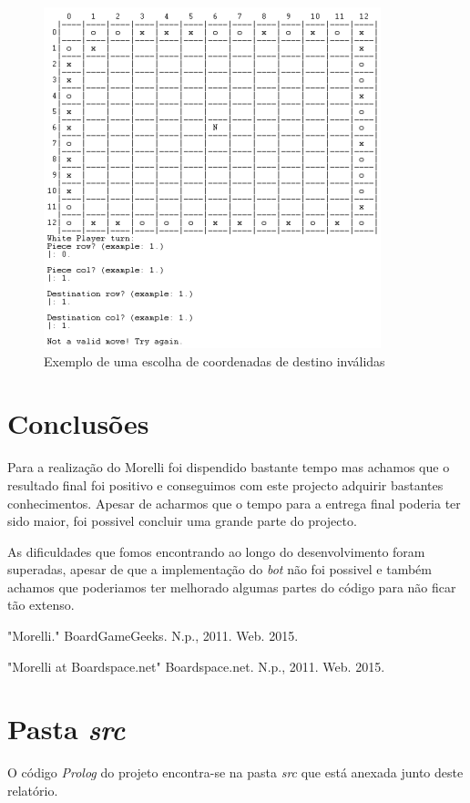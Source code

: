 \documentclass[a4paper]{article}
\begin{document}
\begin{figure}[h!]
\begin{center}
\hspace*{-0.5cm}\includegraphics[scale=1]{game3.png}
\caption{Exemplo de uma escolha de coordenadas de destino inválidas}
\end{center}
\end{figure}



\newpage
\section{Conclusões}
Para a realização do Morelli foi dispendido bastante tempo mas achamos que o resultado final foi positivo e conseguimos com este projecto adquirir bastantes conhecimentos. Apesar de acharmos que o tempo para a entrega final poderia ter sido maior, foi possivel concluir uma grande parte do projecto. 
\par As dificuldades que fomos encontrando ao longo do desenvolvimento foram superadas, apesar de que a implementação do \textit{bot} não foi possivel e também achamos que poderiamos ter melhorado algumas partes do código para não ficar tão extenso. 



\clearpage
{}
\renewcommand\refname{Bibliografia}


\par "Morelli." BoardGameGeeks. N.p., 2011. Web. 2015.
\par "Morelli at Boardspace.net"  Boardspace.net. N.p., 2011. Web. 2015.

\newpage
\appendix
\section{Pasta \textit{src}}
O código \textit{Prolog} do projeto encontra-se na pasta \textit{src} que está anexada junto deste relatório.
\end{document}
